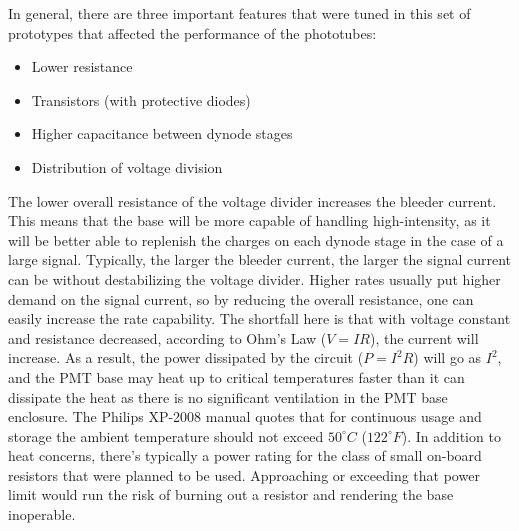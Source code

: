 In general, there are three important features that were tuned in this set of prototypes that affected the performance of the phototubes:
\begin{itemize}
	\item
	Lower resistance
	\item
	Transistors (with protective diodes)
	\item
	Higher capacitance between dynode stages
	\item
	Distribution of voltage division
\end{itemize}

The lower overall resistance of the voltage divider increases the bleeder current. This means that the base will be more capable of handling high-intensity, as it will be better able to replenish the charges on each dynode stage in the case of a large signal. Typically, the larger the bleeder current, the larger the signal current can be without destabilizing the voltage divider. Higher rates usually put higher demand on the signal current, so by reducing the overall resistance, one can easily increase the rate capability. The shortfall here is that with voltage constant and resistance decreased, according to Ohm's Law ($V = IR$), the current will increase. As a result, the power dissipated by the circuit ($P = I^2 R$) will go as $I^2$, and the PMT base may heat up to critical temperatures faster than it can dissipate the heat as there is no significant ventilation in the PMT base enclosure. The Philips XP-2008 manual quotes that for continuous usage and storage the ambient temperature should not exceed $50^\circ C$ ($122^\circ F$). In addition to heat concerns, there's typically a power rating for the class of small on-board resistors that were planned to be used. Approaching or exceeding that power limit would run the risk of burning out a resistor and rendering the base inoperable. 

